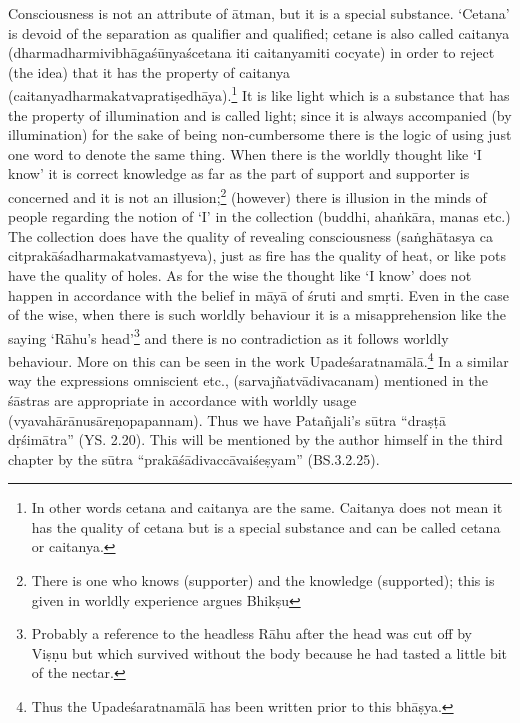 Consciousness is not an attribute of ātman, but it is a special substance. ‘Cetana’ is devoid of the separation as qualifier and qualified; cetane is also called caitanya (dharmadharmivibhāgaśūnyaścetana iti caitanyamiti cocyate) in order to reject (the idea) that it has the property of caitanya (caitanyadharmakatvapratiṣedhāya).\footnote{In other words cetana and caitanya are the same. Caitanya does not mean it has the quality of cetana but is a special substance and can be called cetana or caitanya.} It is like light which is a substance that has the property of illumination and is called light; since it is always accompanied (by illumination) for the sake of being non-cumbersome there is the logic of using just one word to denote the same thing. When there is the worldly thought like ‘I know’ it is correct knowledge as far as the part of support and supporter is concerned and it is not an illusion;\footnote{There is one who knows (supporter) and the knowledge (supported); this is given in worldly experience argues Bhikṣu} (however) there is illusion in the minds of people regarding the notion of ‘I’ in the collection (buddhi, ahaṅkāra,  manas etc.) The collection does have the quality of revealing consciousness (saṅghātasya ca citprakāśadharmakatvamastyeva), just as fire has the quality of heat, or like pots have the quality of holes. As for the wise the thought like ‘I know’ does not happen in accordance with the belief in māyā of śruti and smṛti. Even in the case of the wise, when there is such worldly behaviour it is a misapprehension like the saying ‘Rāhu’s head’\footnote{Probably a reference to the headless Rāhu after the head was cut off by Viṣṇu but which survived without the body because he had tasted a little bit of the nectar.} and  there is no contradiction as it follows worldly behaviour. More on this can be seen in the work Upadeśaratnamālā.\footnote{Thus the Upadeśaratnamālā has been written prior to this bhāṣya.} In a similar way the expressions omniscient etc., (sarvajñatvādivacanam) mentioned in the śāstras are appropriate in accordance with worldly usage (vyavahārānusāreṇopapannam). Thus we have Patañjali’s sūtra “draṣṭā dṛśimātra” (YS. 2.20). This will be mentioned by the author himself in the third chapter by the sūtra “prakāśādivaccāvaiśeṣyam” (BS.3.2.25).

